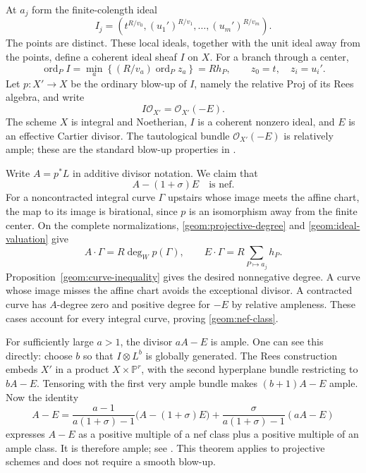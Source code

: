 At $a_j$ form the finite-colength ideal
\[
 I_j=\left(t^{R/v_0},(u_1')^{R/v_1},\ldots,(u_m')^{R/v_m}\right).
\]
The points are distinct. These local ideals, together with the unit
ideal away from the points, define a coherent ideal sheaf $I$ on $X$.
For a branch through a center,
\begin{equation}
\label{geom:ideal-valuation}
 \operatorname{ord}_P I
 =\min_a\left\{(R/v_a)\operatorname{ord}_P z_a\right\}
 =Rh_P,
 \qquad z_0=t,\quad z_i=u_i'.
\end{equation}
Let $p:X'\to X$ be the ordinary blow-up of $I$, namely the relative
Proj of its Rees algebra, and write
\[
 I\mathcal O_{X'}=\mathcal O_{X'}(-E).
\]
The scheme $X$ is integral and Noetherian, $I$ is a coherent nonzero
ideal, and $E$ is an effective Cartier divisor. The tautological
bundle $\mathcal O_{X'}(-E)$ is relatively ample; these are the
standard blow-up properties in
\cite[Tags~02OS, 02ND, and~02NS]{stacks}.

Write $A=p^*L$ in additive divisor notation. We claim that
\begin{equation}
\label{geom:nef-class}
 A-(1+\sigma)E\quad\text{is nef}.
\end{equation}
For a noncontracted integral curve $\Gamma$ upstairs whose image
meets the affine chart, the map to its image is birational, since
$p$ is an isomorphism away from the finite center. On the complete
normalizations, \eqref{geom:projective-degree} and
\eqref{geom:ideal-valuation} give
\[
 A\cdot\Gamma=R\deg_W p(\Gamma),\qquad
 E\cdot\Gamma=R\sum_{P\mapsto a_j}h_P.
\]
Proposition~\ref{geom:curve-inequality} gives the desired nonnegative
degree. A curve whose image misses the affine chart avoids the
exceptional divisor. A contracted curve has $A$-degree zero and
positive degree for $-E$ by relative ampleness. These cases account
for every integral curve, proving \eqref{geom:nef-class}.

For sufficiently large $a>1$, the divisor $aA-E$ is ample. One
can see this directly: choose $b$ so that $I\otimes L^b$ is globally
generated. The Rees construction embeds $X'$ in a product
$X\times\mathbb P^r$, with the second hyperplane bundle restricting
to $bA-E$. Tensoring with the first very ample bundle makes
$(b+1)A-E$ ample. Now the identity
\begin{equation}
\label{geom:ample-combination}
 A-E=
 \frac{a-1}{a(1+\sigma)-1}\bigl(A-(1+\sigma)E\bigr)
 +\frac{\sigma}{a(1+\sigma)-1}(aA-E)
\end{equation}
expresses $A-E$ as a positive multiple of a nef class plus a
positive multiple of an ample class. It is therefore ample;
see \cite[Corollary~1.4.10]{lazarsfeld}. This theorem applies to
projective schemes and does not require a smooth blow-up.

